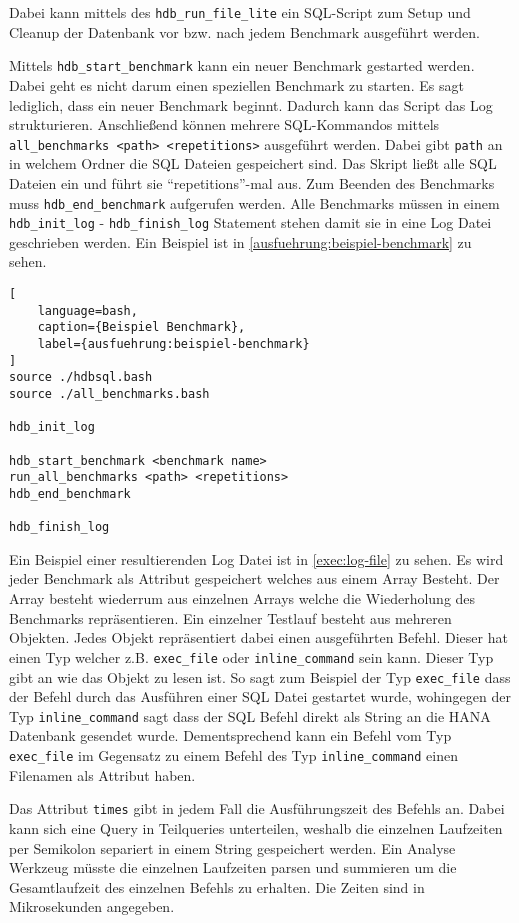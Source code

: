 Dabei kann mittels des \verb+hdb_run_file_lite+ ein SQL-Script
zum Setup und Cleanup der Datenbank vor bzw. nach jedem Benchmark ausgeführt werden.

Mittels \verb+hdb_start_benchmark+ kann ein neuer Benchmark gestarted werden.
Dabei geht es nicht darum einen speziellen Benchmark zu starten.
Es sagt lediglich, dass ein neuer Benchmark beginnt. Dadurch kann das Script
das Log strukturieren.
Anschließend können mehrere SQL-Kommandos mittels \verb+all_benchmarks <path> <repetitions>+ ausgeführt werden.
Dabei gibt \verb+path+ an in welchem Ordner die SQL Dateien gespeichert sind.
Das Skript ließt alle SQL Dateien ein und führt sie \enquote{repetitions}-mal aus.
Zum Beenden des Benchmarks muss \verb+hdb_end_benchmark+ aufgerufen werden.
Alle Benchmarks müssen in einem \verb+hdb_init_log+ - \verb+hdb_finish_log+ Statement 
stehen damit sie in eine Log Datei geschrieben werden.
Ein Beispiel ist in \autoref{ausfuehrung:beispiel-benchmark} zu sehen.

\begin{lstlisting}[
	language=bash,
	caption={Beispiel Benchmark},
	label={ausfuehrung:beispiel-benchmark}
]
source ./hdbsql.bash
source ./all_benchmarks.bash

hdb_init_log

hdb_start_benchmark <benchmark name>
run_all_benchmarks <path> <repetitions>
hdb_end_benchmark

hdb_finish_log
\end{lstlisting}

Ein Beispiel einer resultierenden Log Datei ist in \autoref{exec:log-file} zu sehen.
Es wird jeder Benchmark als Attribut gespeichert welches aus einem Array Besteht.
Der Array besteht wiederrum aus einzelnen Arrays welche die Wiederholung des Benchmarks repräsentieren.
Ein einzelner Testlauf besteht aus mehreren Objekten. Jedes Objekt repräsentiert dabei
einen ausgeführten Befehl. Dieser hat einen Typ welcher z.B. \verb+exec_file+ oder 
\verb+inline_command+ sein kann.
Dieser Typ gibt an wie das Objekt zu lesen ist. So sagt zum Beispiel der Typ \verb+exec_file+
dass der Befehl durch das Ausführen einer SQL Datei gestartet wurde, wohingegen
der Typ \verb+inline_command+ sagt dass der SQL Befehl direkt als String
an die HANA Datenbank gesendet wurde. Dementsprechend kann ein Befehl vom Typ \verb+exec_file+
im Gegensatz zu einem Befehl des Typ \verb+inline_command+ einen Filenamen als Attribut haben.

Das Attribut \verb+times+ gibt in jedem Fall die Ausführungszeit des Befehls an.
Dabei kann sich eine Query in Teilqueries unterteilen, weshalb die einzelnen Laufzeiten
per Semikolon separiert in einem String gespeichert werden.
Ein Analyse Werkzeug müsste die einzelnen Laufzeiten parsen und summieren um die
Gesamtlaufzeit des einzelnen Befehls zu erhalten.
Die Zeiten sind in Mikrosekunden angegeben.

